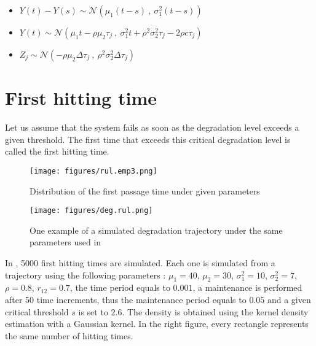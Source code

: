 \begin{itemize}
\item   $ \displaystyle Y(t)-Y(s)\sim  \mathcal{N}\left(\mu_1 (t-s)\ ,\ \sigma_1^2 (t-s)\right)$
\item   $\displaystyle  Y(t)\sim \mathcal{N}\left(\mu_1t-\rho \mu_2 \tau_j\ ,\  \sigma_1^2 t +\rho^2 \sigma_2^2 \tau_j -2 \rho c \tau_j \right)$
\item  $Z_j\sim \mathcal{N}\left(-\rho \mu_2 \Delta \tau_j\ ,\  \rho^2 \sigma_2^2 \Delta \tau_j\right)$ 
\end{itemize}


\section{First hitting time}

Let us assume that the system fails as soon as the degradation level exceeds a given threshold.
The first time that exceeds this critical degradation level is called the first hitting time. 

\begin{figure}[h!]
\begin{multicols}{2}
\centering

\texttt{[image: figures/rul.emp3.png]}
\caption{Distribution of the first passage time under given parameters}
\label{rul1} 

\columnbreak

\texttt{[image: figures/deg.rul.png]}
\caption{One example of a simulated degradation trajectory under the same parameters used in }
\label{trajrul} 
\end{multicols}
\end{figure}





In , 5000 first hitting times are simulated. Each one is simulated from a trajectory using the following parameters : $\mu_1=40$, $\mu_2=30$, $\sigma_1^2=10$, $\sigma_2^2=7$, $\rho=0.8$, $r_{12}=0.7$, the time period equals to $0.001$, a maintenance is performed after 50 time increments, thus the maintenance period equals to $0.05$ and a given critical threshold $s$ is set to $2.6$. The density is obtained using the kernel density estimation with a Gaussian kernel. In the right figure, every rectangle represents the same number of hitting times.


